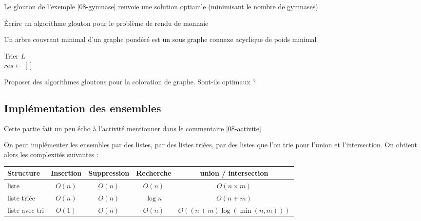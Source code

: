 \begin{proposition}
	Le glouton de l'exemple \ref{08-gymnase} renvoie une solution optiamle (minimisant le nombre de gymnases)
\end{proposition}

\begin{exercise}
	Écrire un algorithme glouton pour le problème de rendu de monnaie
\end{exercise}

\begin{definition}
	Un arbre couvrant minimal d'un graphe pondéré est un sous graphe connexe acyclique de poids minimal
\end{definition}

\begin{algorithm}[H]
	\caption{$kruskal$}
	Trier $L$\\
	$res \gets []$
\end{algorithm}

\begin{exercise}
	Proposer des algorithmes gloutons pour la coloration de graphe. Sont-ils optimaux ?
\end{exercise}

\subsection{Implémentation des ensembles}

\begin{com}
	Cette partie fait un peu écho à l'activité mentionner dans le commentaire \ref{08-activite}
\end{com}

\begin{proposition}
	On peut implémenter les ensembles par des listes, par des listes triées, par des listes que l'on trie pour l'union et l'intersection. On obtient alors les complexités suivantes :\\ \normalfont \begin{tabular}{|l|c|c|c|c|}
		\hline Structure & Insertion & Suppression & Recherche & union / intersection\\
		\hline liste & $O(n)$ & $O(n)$ & $O(n)$ & $O(n\times m)$ \\
		\hline liste triée & $O(n)$ & $O(n)$ & $\log n$ & $O(n+m)$ \\
		\hline liste avec tri & $O(1)$ & $O(n)$ & $O(n)$ & $O((n+m) \log(\min(n, m)))$ \\
		\hline
	\end{tabular}
\end{proposition}

